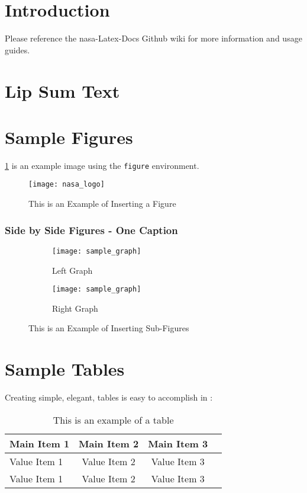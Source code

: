 \documentclass[]{nasa-latex-docs}
\begin{document}
\section{Introduction}

Please reference the \acrshort{nasa}-Latex-Docs Github wiki\cite{Template-Guide} for more information and usage guides.

\section{Lip Sum Text}

\lipsum[1-4]

\section{Sample Figures}

\ref{fig:NASA_logo} is an example image using the \texttt{figure} environment.

\begin{figure}[H]
   \texttt{[image: nasa\_logo]} 
   \caption{This is an Example of Inserting a Figure}
   \label{fig:NASA_logo}
\end{figure}

\subsubsection{Side by Side Figures - One Caption}

\begin{figure}[H]
\begin{subfigure}[H]{0.49\textwidth}
   \texttt{[image: sample\_graph]}
   \caption{Left Graph}
   \label{fig:sample_graph_L}
\end{subfigure}
\begin{subfigure}[H]{0.49\textwidth}
   \texttt{[image: sample\_graph]}
   \caption{Right Graph}
   \label{fig:sample_graph_R}
\end{subfigure}
\caption{This is an Example of Inserting Sub-Figures}
   \label{fig:sub_figures}
\end{figure}

\section{Sample Tables}

Creating simple, elegant, tables is easy to accomplish in \latex:

\begin{table}[H]
   \caption{This is an example of a \latex table}
   \label{tab:TabEx}
   \begin{tabular}{lccr}
      \toprule[\heavyrulewidth]
      \toprule[\heavyrulewidth]
      \textbf{Main Item 1} & \textbf{Main Item 2} & \textbf{Main Item 3} \\
      \midrule
      Value Item 1 & Value Item 2 & Value Item 3 \\
      Value Item 1 & Value Item 2 & Value Item 3 \\
      \bottomrule[\heavyrulewidth]
   \end{tabular}
\end{table}
\end{document}
